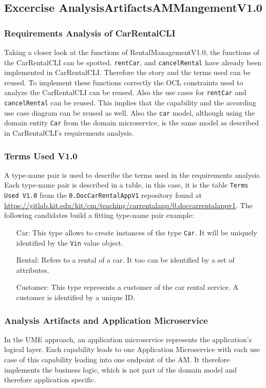 \subsection{Excercise AnalysisArtifactsAMMangementV1.0}
\subsubsection*{Requirements Analysis of CarRentalCLI}
Taking a closer look at the functions of RentalManagementV1.0, the functions of the CarRentalCLI can be spotted.
\texttt{rentCar}, and \texttt{cancelRental} have already been implemented in CarRentalCLI.
Therefore the story and the terms used can be reused.
To implement these functions correctly the OCL constraints used to analyze the CarRentalCLI can be reused.
Also the use cases for \texttt{rentCar} and \texttt{cancelRental} can be reused.
This implies that the capability and the according use case diagram can be reused as well.
Also the \texttt{car} model, although using the domain entity \texttt{Car} from the domain microservice, is the same model as described in CarRentalCLI's requirements analysis.

\subsubsection*{Terms Used V1.0}
A type-name pair is used to describe the terms used in the requirements analysis.
Each type-name pair is described in a table, in this case, it is the table \texttt{Terms Used V1.0} from the \texttt{0.DocCarRentalAppV1} repository found at \url{https://gitlab.kit.edu/kit/cm/teaching/carrentalapp/0.doccarrentalappv1}.
The following candidates build a fitting type-name pair example:
\begin{itemize}
    \item[Car:] This type allows to create instances of the type \texttt{Car}.
    It will be uniquely identified by the \texttt{Vin} value object. 
    \item[Rental:] Refers to a rental of a car.
    It too can be identified by a set of attributes.
    \item[Customer:] This type represents a customer of the car rental service.
    A customer is identified by a unique ID.
\end{itemize}
\subsubsection*{Analysis Artifacts and Application Microservice}
In the UME approach, an application microservice represents the application's logical layer.
Each capability leads to one Application Microservice with each use case of this capability leading into one endpoint of the AM.
It therefore implements the business logic, which is not part of the domain model and therefore application specific.


